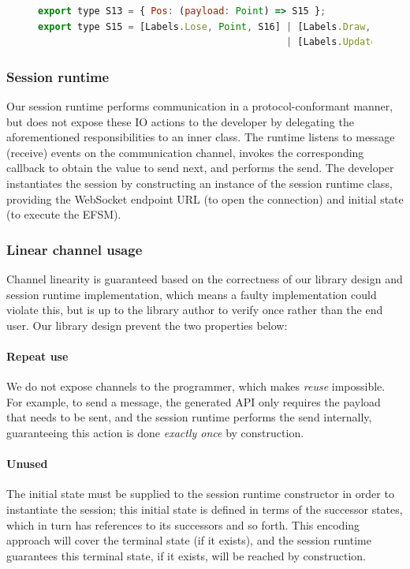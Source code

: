 \documentclass[submission,copyright,creativecommons]{eptcs}
\begin{document}
\begin{figure}[!h]
\begin{lstlisting}[language=JavaScript]
export type S13 = { Pos: (payload: Point) => S15 };
export type S15 = [Labels.Lose, Point, S16] | [Labels.Draw, Point, S17]
											| [Labels.Update, Point, S18];
\end{lstlisting}  
\label{lst:svr}
\end{figure}

\subsubsection{Session runtime}
\label{section:serversessionapi}

Our session runtime performs communication in a protocol-conformant manner, but does not expose these IO actions to the developer by delegating the aforementioned responsibilities to an inner class. The runtime listens to message (receive) events on the communication channel, invokes the corresponding callback to obtain the value to send next, and performs the send. The developer instantiates the session by constructing an instance of the session runtime class, providing the WebSocket endpoint URL (to open the connection) and initial state (to execute the EFSM).

\subsubsection{Linear channel usage}
\label{section:serverlinear}
Channel linearity is guaranteed based on the correctness of our library design and session runtime implementation, which means a faulty implementation could violate this, but is up to the library author to verify once rather than the end user. Our library design prevent the two properties below:

\paragraph{Repeat use} We do not expose channels to the programmer, which makes \textit{reuse} impossible. For example, to send a message, the generated API only requires the payload that needs to be sent, and the session runtime performs the send internally, guaranteeing this action is done \textit{exactly once} by construction.

\paragraph{Unused} The initial state must be supplied to the session runtime constructor in order to instantiate the session; this initial state is defined in terms of the successor states, which in turn has references to its successors and so forth. This encoding approach will cover the terminal state (if it exists), and the session runtime guarantees this terminal state, if it exists, will be reached by construction. 
\end{document}
